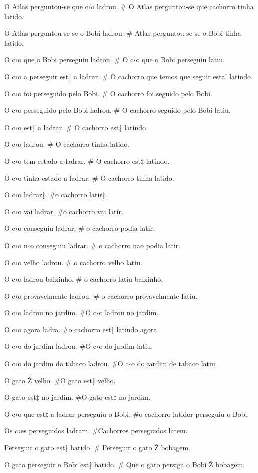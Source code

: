 O Atlas perguntou-se que c‹o ladrou.
# O Atlas perguntou-se que cachorro tinha latido.

O Atlas perguntou-se se o Bobi ladrou.
# Atlas perguntou-se se o Bobi tinha latido.

O c‹o que o Bobi perseguiu ladrou.
# O c‹o que o Bobi perseguiu latiu.

O c‹o a perseguir est‡ a ladrar.
# O cachorro que temos que seguir esta' latindo.

O c‹o foi perseguido pelo Bobi.
# O cachorro foi seguido pelo Bobi.

O c‹o perseguido pelo Bobi ladrou.
# O cachorro seguido pelo Bobi latiu.

O c‹o est‡ a ladrar.
# O cachorro est‡ latindo.

O c‹o ladrou.
# O cachorro tinha latido.

O c‹o tem estado a ladrar.
# O cachorro est‡ latindo.

O c‹o tinha estado a ladrar.
# O cachorro tinha latido.

O c‹o ladrar‡.
#o cachorro latir‡.

O c‹o vai ladrar.
#o cachorro vai latir.

O c‹o conseguiu ladrar.
# o cachorro podia latir.

O c‹o n‹o conseguiu ladrar.
# o cachorro nao podia latir.

O c‹o velho ladrou.
# o cachorro velho latiu.

O c‹o ladrou baixinho.
# o cachorro latiu baixinho.

O c‹o provavelmente ladrou.
# o cachorro provavelmente latiu.

O c‹o ladrou no jardim.
#O c‹o ladrou no jardim.

O c‹o agora ladra.
#o cachorro est‡ latindo agora.

O c‹o do jardim ladrou.
#O c‹o do jardim latiu.

O c‹o do jardim do tabaco ladrou.
#O c‹o do jardim de tabaco latiu.

O gato Ž velho.
#O gato est‡ velho.

O gato est‡ no jardim.
#O gato est‡ no jardim.

O c‹o que est‡ a ladrar perseguiu o Bobi.
#o cachorro latidor perseguiu o Bobi.

Os c‹es perseguidos ladram.
#Cachorros perseguidos latem.

Perseguir o gato est‡ batido.
# Perseguir o gato Ž bobagem.

O gato perseguir o Bobi est‡ batido.
# Que o gato persiga o Bobi Ž bobagem.

